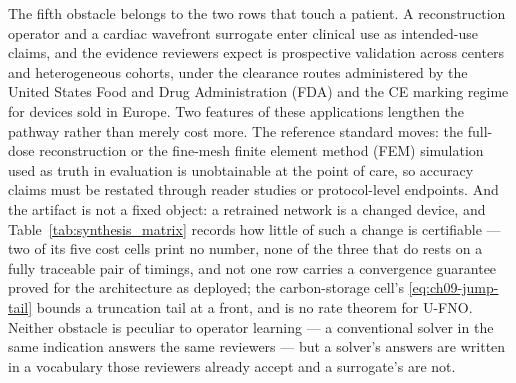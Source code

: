 The fifth obstacle belongs to the two rows that touch a patient. A reconstruction operator and
a cardiac wavefront surrogate enter clinical use as intended-use claims, and the evidence
reviewers expect is prospective validation across centers and heterogeneous cohorts, under
the clearance routes administered by the United States Food and Drug Administration (FDA) and
the CE marking regime for devices sold in Europe. Two features of these applications lengthen
the pathway rather than merely cost more. The reference standard moves: the full-dose
reconstruction or the fine-mesh finite element method (FEM) simulation used as truth in
evaluation is unobtainable at the point of care, so accuracy claims must be restated through
reader studies or protocol-level endpoints. And the artifact is not a fixed object: a
retrained network is a changed device, and Table~\ref{tab:synthesis_matrix} records how little
of such a change is certifiable --- two of its five cost cells print no number, none of the
three that do rests on a fully traceable pair of timings, and not one row carries a
convergence guarantee proved for the architecture as deployed; the carbon-storage cell's
\eqref{eq:ch09-jump-tail} bounds a truncation tail at a front, and is no rate theorem for
U-FNO. Neither
obstacle is peculiar to operator learning --- a conventional solver in the same indication
answers the same reviewers --- but a solver's answers are written in a vocabulary those
reviewers already accept and a surrogate's are
not.


